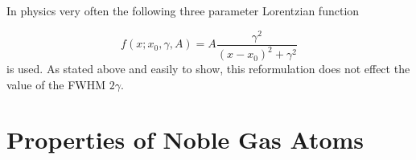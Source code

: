 \begin{appendix}

%
%
%
%  


In physics very often the following three parameter Lorentzian function

\begin{equation}
  f(x;x_0,\gamma,A) = A \frac{\gamma^2}{(x-x_0)^2 + \gamma^2}
\end{equation}
is used. As stated above and easily to show, this reformulation does
not effect the value of the FWHM $2 \gamma$.



\chapter{Properties of Noble Gas Atoms}


\end{appendix}
